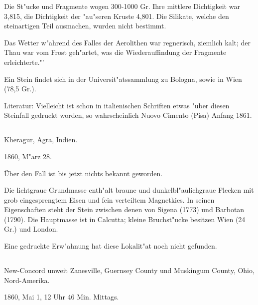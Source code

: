\documentclass[a4paper, 11pt, oneside]{article}
\begin{document}
Die St"ucke und Fragmente wogen 300-1000 Gr. Ihre mittlere Dichtigkeit war 3,815, die Dichtigkeit der "au"seren Kruste 4,801. Die Silikate, welche den steinartigen Teil ausmachen, wurden nicht bestimmt.

Das Wetter w"ahrend des Falles der Aerolithen war regnerisch, ziemlich kalt; der Thau war vom Frost geh"artet, was die Wiederauffindung der Fragmente erleichterte."'

Ein Stein findet sich in der Universit"atssammlung zu Bologna, sowie in Wien (78,5 Gr.).

\normalsize
Literatur: Vielleicht ist schon in italienischen Schriften etwas "uber diesen Steinfall gedruckt worden, so wahrscheinlich Nuovo Cimento (Pisa) Anfang 1861.

\subsection{}
\LARGE
\paragraph{}
Kheragur, Agra, Indien.

1860, M"arz 28.

Über den Fall ist bis jetzt nichts bekannt geworden.

Die lichtgraue Grundmasse enth"alt braune und dunkelbl"aulichgraue Flecken mit grob eingesprengtem Eisen und fein verteiltem Magnetkies. In seinen Eigenschaften steht der Stein zwischen denen von Sigena (1773) und Barbotan (1790). Die Hauptmasse ist in Calcutta; kleine Bruchst"ucke besitzen Wien (24 Gr.) und London.

Eine gedruckte Erw"ahnung hat diese Lokalit"at noch nicht gefunden.

\subsection{}
\LARGE
\paragraph{}
New-Concord unweit Zanesville, Guernsey County und Muskingum County, Ohio, Nord-Amerika.

1860, Mai 1, 12 Uhr 46 Min. Mittags.
\end{document}
